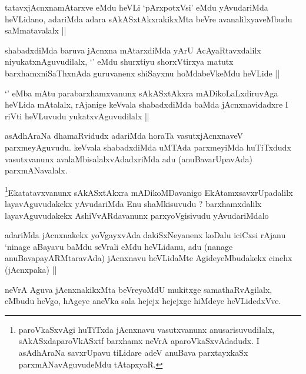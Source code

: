 
\begin{artha}
tatavxjAcnxnamAtarxve eMdu heVLi `pArxpotxVsi' eMdu yAvudariMda heVLidano, adariMda adara sAkASxtAkxrakikxMta beVre avanalilxyaveMbudu saMmatavalalx ||
\end{artha}

\begin{artha}
shabadxdiMda baruva jAcnxna mAtarxdiMda yArU AcAyaRtavxdalilx niyukatxnAguvudilalx, `\stext' eMdu shurxtiyu shorxVtirxya matutx barxhamxniSaThxnAda guruvanenx shiSayxnu hoMdabeVkeMdu heVLide ||
\end{artha}

\begin{artha}
`\stext' eMba mAtu parabarxhamxvanunx sAkASxtAkxra mADikoLaLxdiruvAga heVLida mAtalalx, rAjanige keVvala shabadxdiMda baMda jAcnxnavidadxre I riVti heVLuvudu yukatxvAguvudilalx ||
\end{artha}

\begin{artha}
asAdhAraNa dhamaRvidudx adariMda horaTa vasutxjAcnxnaveV parxmeyAguvudu. keVvala shabadxdiMda uMTAda parxmeyiMda huTiTxdudx vasutxvanunx avalaMbisalalxvAdadxriMda adu (anuBavarUpavAda) parxmANavalalx.
\end{artha}

\begin{artha}
\footnote{paroVkaSxvAgi huTiTxda jAcnxnavu vasutxvanunx anusarisuvudilalx, sAkASxdaparoVkASxtf barxhamx neVrA aparoVkaSxvAdadudx. I asAdhAraNa savxrUpavu tiLidare adeV anuBava parxtayxkaSx parxmANavAguvudeMdu tAtapxyaR.}Ekatatavxvanunx sAkASxtAkxra mADikoMDavanigo EkAtamxsavxrUpadalilx layavAguvudakekx yAvudariMda Enu shaMkisuvudu ? barxhamxdalilx layavAguvudakekx AshiVvARdavanunx parxyoVgisivudu yAvudariMdalo
\end{artha}

\begin{artha}
adariMda jAcnxnakekx yoVgayxvAda dakiSxNeyanenx koDalu iciCxsi rAjanu `ninage aBayavu baMdu seVrali eMdu heVLidanu, adu (nanage anuBavapayARMtaravAda) jAcnxnavu heVLidaMte AgideyeMbudakekx cinehx (jAcnxpaka) ||
\end{artha}


\begin{artha}
neVrA Aguva jAcnxnakikxMta beVreyoMdU mukitxge samathaRvAgilalx, eMbudu heVgo, hAgeye aneVka sala hejejx hejejxge hiMdeye heVLidedxVve.
\end{artha}

